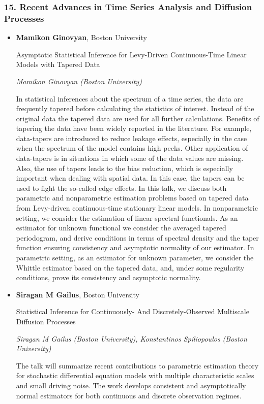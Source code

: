 \subsubsection*{15. Recent Advances in Time Series Analysis and Diffusion Processes}

\begin{itemize}
\item \textbf{Mamikon Ginovyan}, Boston University

Asymptotic Statistical Inference for Levy-Driven Continuous-Time Linear Models with Tapered Data

\emph{\footnotesize Mamikon Ginovyan (Boston University)}

In statistical inferences about the spectrum of a time series, the data are frequently tapered before calculating the statistics of interest. Instead of the original data the tapered data are used for all further calculations. Benefits of tapering the data have been widely reported in the literature. For example, data-tapers are introduced to reduce leakage effects, especially in the case when the spectrum of the model contains high peeks. Other application of data-tapers is in situations in which some of the data values are missing. Also, the use of tapers leads to the bias reduction, which is especially important when dealing with spatial data. In this case, the tapers can be used to fight the so-called edge effects. In this talk, we discuss both parametric and nonparametric estimation problems based on tapered data from Levy-driven continuous-time stationary linear models. In nonparametric setting, we consider the estimation of linear spectral functionals. As an estimator for unknown functional we consider the averaged tapered periodogram, and derive conditions in terms of spectral density and the taper function ensuring consistency and asymptotic normality of our estimator. In parametric setting, as an estimator for unknown parameter, we consider the Whittle estimator based on the tapered data, and, under some regularity conditions, prove its consistency and asymptotic normality.

\item \textbf{Siragan M Gailus}, Boston University

Statistical Inference for Continuously- And Discretely-Observed Multiscale Diffusion Processes

\emph{\footnotesize Siragan M Gailus (Boston University), Konstantinos Spiliopoulos (Boston University)}

The talk will summarize recent contributions to parametric estimation theory for stochastic differential equation models with multiple characteristic scales and small driving noise. The work develops consistent and asymptotically normal estimators for both continuous and discrete observation regimes.


\end{itemize}
